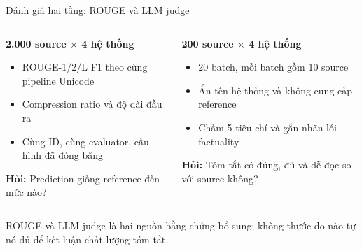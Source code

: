 \documentclass[aspectratio=169,10pt]{beamer}
\begin{document}

\begin{frame}{Đánh giá hai tầng: ROUGE và LLM judge}
  \begin{columns}[T,onlytextwidth]
      \begin{tcolorbox}[
        title=Đánh giá tự động trên toàn bộ test,
        colback=SoftGreen,colframe=GoodGreen,
        colbacktitle=GoodGreen,coltitle=white,
        fonttitle=\bfseries]
        \footnotesize
        \textbf{2.000 source $\times$ 4 hệ thống}
        \begin{itemize}\setlength{\itemsep}{1pt}
          \item ROUGE-1/2/L F1 theo cùng pipeline Unicode
          \item Compression ratio và độ dài đầu ra
          \item Cùng ID, cùng evaluator, cấu hình đã đóng băng
        \end{itemize}
        \textbf{Hỏi:} Prediction giống reference đến mức nào?
      \end{tcolorbox}

      \begin{tcolorbox}[
        title=Đánh giá source-grounded bằng LLM,
        colback=SoftBlue,colframe=MidBlue,
        colbacktitle=MidBlue,coltitle=white,
        fonttitle=\bfseries]
        \footnotesize
        \textbf{200 source $\times$ 4 hệ thống}
        \begin{itemize}\setlength{\itemsep}{1pt}
          \item 20 batch, mỗi batch gồm 10 source
          \item Ẩn tên hệ thống và không cung cấp reference
          \item Chấm 5 tiêu chí và gắn nhãn lỗi factuality
        \end{itemize}
        \textbf{Hỏi:} Tóm tắt có đúng, đủ và dễ đọc so với source không?
      \end{tcolorbox}
  \end{columns}

  \vspace{1mm}
  \begin{keymessage}
    \scriptsize ROUGE và LLM judge là hai nguồn bằng chứng bổ sung; không thước đo nào tự nó đủ để kết luận chất lượng tóm tắt.
  \end{keymessage}
\end{frame}
\end{document}
